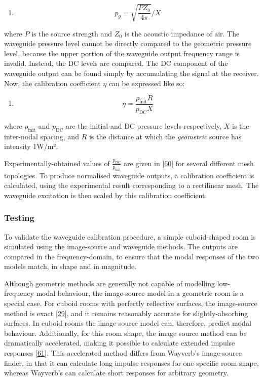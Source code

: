 \documentclass[]{scrreprt}
\providecommand{\tightlist}{%
  \setlength{\itemsep}{0pt}\setlength{\parskip}{0pt}}
\begin{document}
\begin{enumerate}
\def\labelenumi{(\arabic{enumi})}
\setcounter{enumi}{30}
\tightlist
\item
  \[ p_g=\sqrt{\frac{PZ_0}{4\pi}} / X \]
\end{enumerate}

where \(P\) is the source strength and \(Z_0\) is the acoustic impedance
of air. The waveguide pressure level cannot be directly compared to the
geometric pressure level, because the upper portion of the waveguide
output frequency range is invalid. Instead, the DC levels are compared.
The DC component of the waveguide output can be found simply by
accumulating the signal at the receiver. Now, the calibration
coefficient \(\eta\) can be expressed like so:

\begin{enumerate}
\def\labelenumi{(\arabic{enumi})}
\setcounter{enumi}{31}
\tightlist
\item
  \[\eta = \frac{p_\text{init}R}{p_\text{DC}X}\]
\end{enumerate}

where \(p_\text{init}\) and \(p_\text{DC}\) are the initial and DC
pressure levels respectively, \(X\) is the inter-nodal spacing, and
\(R\) is the distance at which the \emph{geometric} source has intensity
1W/m².

Experimentally-obtained values of \(\frac{p_\text{DC}}{p_\text{init}}\)
are given in
{[}\protect\hyperlink{ref-siltanenux5ffinite-differenceux5f2013}{60}{]}
for several different mesh topologies. To produce normalised waveguide
outputs, a calibration coefficient is calculated, using the experimental
result corresponding to a rectilinear mesh. The waveguide excitation is
then scaled by this calibration coefficient.

\subsubsection{Testing}\label{testing}

To validate the waveguide calibration procedure, a simple cuboid-shaped
room is simulated using the image-source and waveguide methods. The
outputs are compared in the frequency-domain, to ensure that the modal
responses of the two models match, in shape and in magnitude.

Although geometric methods are generally not capable of modelling
low-frequency modal behaviour, the image-source model in a geometric
room is a special case. For cuboid rooms with perfectly reflective
surfaces, the image-source method is exact
{[}\protect\hyperlink{ref-kuttruffux5froomux5f2009}{29}{]}, and it
remains reasonably accurate for slightly-absorbing surfaces. In cuboid
rooms the image-source model can, therefore, predict modal behaviour.
Additionally, for this room shape, the image source method can be
dramatically accelerated, making it possible to calculate extended
impulse responses
{[}\protect\hyperlink{ref-allenux5fimageux5f1979}{61}{]}. This
accelerated method differs from Wayverb's image-source finder, in that
it can calculate long impulse responses for one specific room shape,
whereas Wayverb's can calculate short responses for arbitrary geometry.
\end{document}
